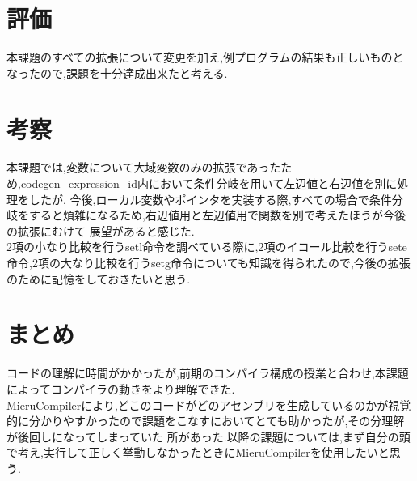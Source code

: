 \documentclass[10pt]{jsarticle}
\begin{document}
\section{評価}
本課題のすべての拡張について変更を加え,例プログラムの結果も正しいものとなったので,課題を十分達成出来たと考える.

\section{考察}
本課題では,変数について大域変数のみの拡張であったため,codegen\_expression\_id内において条件分岐を用いて左辺値と右辺値を別に処理をしたが,
今後,ローカル変数やポインタを実装する際,すべての場合で条件分岐をすると煩雑になるため,右辺値用と左辺値用で関数を別で考えたほうが今後の拡張にむけて
展望があると感じた.\\
2項の小なり比較を行うsetl命令を調べている際に,2項のイコール比較を行うsete命令,2項の大なり比較を行うsetg命令についても知識を得られたので,今後の拡張のために記憶をしておきたいと思う.

\section{まとめ}
コードの理解に時間がかかったが,前期のコンパイラ構成の授業と合わせ,本課題によってコンパイラの動きをより理解できた.\\
MieruCompilerにより,どこのコードがどのアセンブリを生成しているのかが視覚的に分かりやすかったので課題をこなすにおいてとても助かったが,その分理解が後回しになってしまっていた
所があった.以降の課題については,まず自分の頭で考え,実行して正しく挙動しなかったときにMieruCompilerを使用したいと思う.
\end{document}
